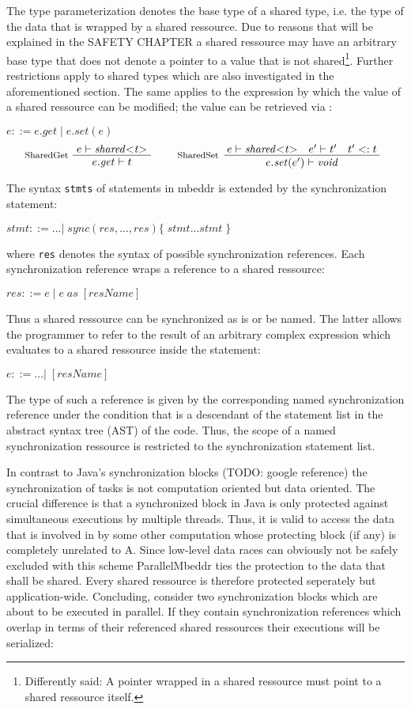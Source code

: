 The type parameterization denotes the base type of a shared type, i.e. the type of the data that is wrapped by a shared ressource. Due to reasons that will be explained in the SAFETY CHAPTER a shared ressource may have an arbitrary base type that does not denote a pointer to a value that is not shared\footnote{Differently said: A pointer wrapped in a shared ressource must point to a shared ressource itself.}. Further restrictions apply to shared types which are also investigated in the aforementioned section. The same applies to the  expression by which the value of a shared ressource can be modified; the value can be retrieved via :

$ e ::= e.\mathit{get}\;|\;e.\mathit{set(e)} $
\begin{align*}
\inference*[SharedGet]{e |- \mathit{shared{<}t{>}}} {\quad e.\mathit{get} |- t \quad}
\qquad
\inference*[SharedSet]{e |- \mathit{shared{<}t{>}} \quad e' |- t' \quad t' <: t} {\qquad\quad e.\mathit{set}(e') |- \mathit{void} \quad\qquad} 
\end{align*}

The syntax \texttt{stmts} of statements in mbeddr is extended by the synchronization statement:

$ \mathit{stmt} ::= ...
        |\;\mathit{sync}(res, ..., res) \{\;\mathit{stmt} ... \mathit{stmt}\;\}$
        
where \texttt{res} denotes the syntax of possible synchronization references. Each synchronization reference wraps a reference to a shared ressource:

$ res ::= e\;|\;e\;\mathit{as}\;[\mathit{resName}] $

Thus a shared ressource can be synchronized as is or be named. The latter allows the programmer to refer to the result of an arbitrary complex expression which evaluates to a shared ressource inside the  statement:

$ e ::= ...|\;[\mathit{resName}]$

The type of such a reference is given by the corresponding named synchronization reference under the condition that \CODE{[resName]} is a descendant of the statement list in the abstract syntax tree (AST) of the code. Thus, the scope of a named synchronization ressource is restricted to the synchronization statement list. 

In contrast to Java's synchronization blocks (TODO: google reference) the synchronization of tasks is not computation oriented but data oriented. The crucial difference is that a synchronized block  in Java is only protected against simultaneous executions by multiple threads. Thus, it is valid to access the data that is involved in  by some other computation whose protecting block (if any) is completely unrelated to A. Since low-level data races can obviously not be safely excluded with this scheme ParallelMbeddr ties the protection to the data that shall be shared. Every shared ressource is therefore protected seperately but application-wide. Concluding, consider two synchronization blocks which are about to be executed in parallel. If they contain synchronization references which overlap in terms of their referenced shared ressources their executions will be serialized:

